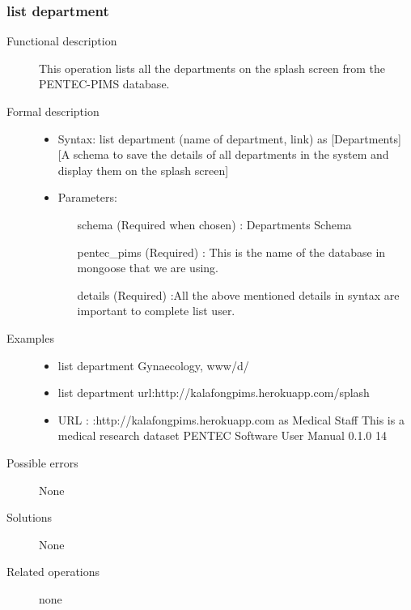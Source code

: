 \documentclass[14pt, a4paper]{article}
\begin{document}
\subsubsection{list department}
\begin{description}
\item[Functional description] This operation lists all the departments on the splash screen from the PENTEC-PIMS database.
\item[Formal description]\hfill
\begin{itemize}
	\item Syntax: list department (name of department, link) as [Departments] [A schema to save the details of all departments in the system and display them on the splash screen]\\
	\item Parameters:
	\begin{itemize}
		\item [schema] (Required when chosen) : Departments Schema
		\item [pentec\_pims] (Required) : This is the name of the database in mongoose that we are using.
		\item [details] (Required) :All the above mentioned details in syntax are important to complete list user.
	\end{itemize}
\end{itemize}

\item[Examples]\hfill
\begin{itemize}
	\item list department Gynaecology, www/d/
	\item list department url:http://kalafongpims.herokuapp.com/splash
	\item URL : :http://kalafongpims.herokuapp.com as Medical Staff This is a medical research dataset
	PENTEC Software User Manual 0.1.0 14
\end{itemize}
\item[Possible errors] None
\item[Solutions] None
\item[Related operations] none
\end{description}
	      
\end{document}
